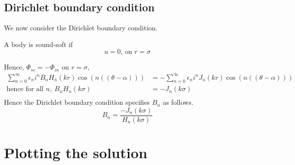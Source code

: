 \subsection*{Dirichlet boundary condition}\label{ss:ch2_dirichlet_bcs}
We now consider the Dirichlet boundary condition.
  \begin{defn}
    \parencite[$\S$1.3.2]{martin06scattering} A body is sound-soft if
      \[
      u = 0 \text{,  on } r = \sigma
      \]
  \end{defn}
Hence, $\Phi_{sc} = - \Phi_{in}$ on $r=\sigma$,
  \begin{align*}
    \sum^\infty_{n=0} \epsilon_n i^n B_n H_n(kr) \cos(n((\theta-\alpha)))
    & = - \sum^\infty_{n=0} \epsilon_n i^n J_n(kr) \cos(n((\theta-\alpha))) \\
    \text{hence for all } n,~ B_n H_n (k\sigma) &= - J_n (k\sigma) \\
  \end{align*}
Hence the Dirichlet boundary condition specifies $B_n$ as follows.
  \begin{equation}
    B_n = \frac{- J_n(k\sigma)}{H_n(k\sigma)}
  \end{equation}

\section{Plotting the solution}
